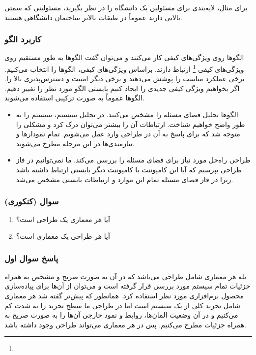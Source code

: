 برای مثال، لایه‌بندی برای مسئولین یک دانشگاه را در نظر بگیرید، مسئولینی که سمتی
بالایی دارند عموماً در طبقات بالاتر ساختمان دانشگاهی هستند.

\subsubsection{کاربرد الگو}

الگو‌ها روی ویژگی‌های کیفی کار می‌کنند و می‌توان گفت الگو‌ها به طور مستقیم روی
ویژگی‌های کیفی \footnote{} ارتباط دارند. براساس ویژگی‌های
کیفی، الگو‌ها را انتخاب می‌کنیم. برخی عملکرد مناسب را پوشش می‌دهند و برخی دیگر
امنیت و دسترس‌پذیری بالا را. اگر بخواهیم ویژگی کیفی جدیدی را ایجاد کنیم بایستی
الگو مورد نظر را تغییر دهیم. الگو‌ها عموماً به صورت ترکیبی استفاده می‌شوند.

\begin{itemize}
    \item الگو‌ها تحلیل فضای مسئله را مشخص می‌کنند. در تحلیل سیستم، سیستم را به
    طور واضح خواهیم شناخت. ارتباطات آن را بیشتر می‌توان درک کرد و مشکلی را متوجه
    شد که برای پاسخ به آن در طراحی وارد عمل می‌شویم. تمام نمودار‌ها و
    نیازمندی‌ها در این مرحله مطرح می‌شوند.
    \item طراحی راه‌حل مورد نیاز برای فضای مسئله را بررسی می‌کند. ما نمی‌توانیم
    در فاز طراحی بپرسیم که آیا این کامپوننت با کامپوننت دیگر بایستی ارتباط داشته
    باشد زیرا در فاز فضای مسئله تمام این موارد و ارتباطات بایستی مشخص می‌شد.
\end{itemize}

\subsubsection*{سوال (کنکوری)}

\begin{enumerate}
    \item آیا هر معماری یک طراحی است؟
    \item آیا هر طراحی یک معماری است؟
\end{enumerate}

\subsubsection*{پاسخ سوال اول}

بله هر معماری شامل طراحی می‌باشد که در آن به صورت صریح و مشخص به همراه جزئیات
تمام سیستم مورد بررسی قرار گرفته است و می‌توان از آن‌ها برای پیاده‌سازی محصول
نرم‌افزاری مورد نظر استفاده کرد. همانطور که پیش‌تر گفته شد هر معماری شامل تجرید
کلی از یک سیستم است اما در طراحی ما سطح تجرید را به شدت کم می‌کنیم و در آن وضعیت
المان‌ها، روابط و نمود خارجی آن‌ها را به صورت صریح به همراه جزئیات مطرح می‌کنیم.
پس در هر معماری می‌تواند طراحی وجود داشته باشد.

